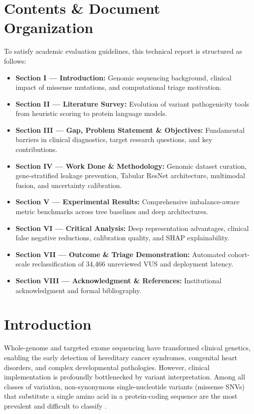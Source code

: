 \documentclass[conference]{IEEEtran}
\begin{document}
\section*{Contents \& Document Organization}
To satisfy academic evaluation guidelines, this technical report is structured as follows:
\begin{itemize}
    \item \textbf{Section I --- Introduction:} Genomic sequencing background, clinical impact of missense mutations, and computational triage motivation.
    \item \textbf{Section II --- Literature Survey:} Evolution of variant pathogenicity tools from heuristic scoring to protein language models.
    \item \textbf{Section III --- Gap, Problem Statement \& Objectives:} Fundamental barriers in clinical diagnostics, target research questions, and key contributions.
    \item \textbf{Section IV --- Work Done \& Methodology:} Genomic dataset curation, gene-stratified leakage prevention, Tabular ResNet architecture, multimodal fusion, and uncertainty calibration.
    \item \textbf{Section V --- Experimental Results:} Comprehensive imbalance-aware metric benchmarks across tree baselines and deep architectures.
    \item \textbf{Section VI --- Critical Analysis:} Deep representation advantages, clinical false negative reductions, calibration quality, and SHAP explainability.
    \item \textbf{Section VII --- Outcome \& Triage Demonstration:} Automated cohort-scale reclassification of 34,466 unreviewed VUS and deployment latency.
    \item \textbf{Section VIII --- Acknowledgment \& References:} Institutional acknowledgment and formal bibliography.
\end{itemize}

\section{Introduction}
Whole-genome and targeted exome sequencing have transformed clinical genetics, enabling the early detection of hereditary cancer syndromes, congenital heart disorders, and complex developmental pathologies. However, clinical implementation is profoundly bottlenecked by variant interpretation. Among all classes of variation, non-synonymous single-nucleotide variants (missense SNVs) that substitute a single amino acid in a protein-coding sequence are the most prevalent and difficult to classify \cite{richards2015standards}.
\end{document}
